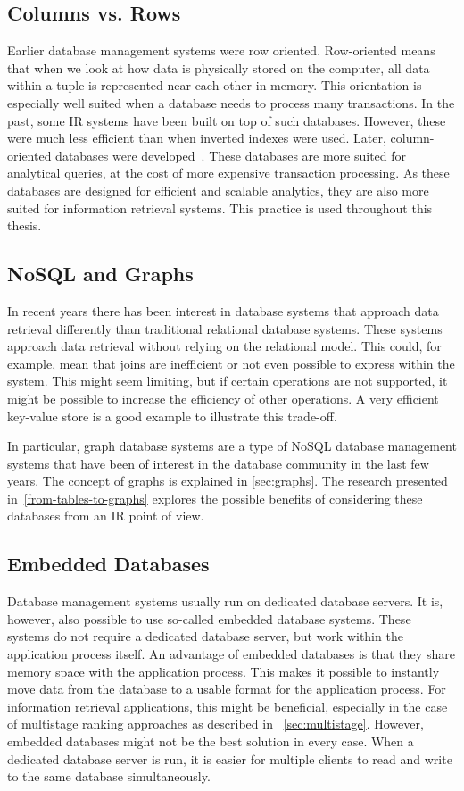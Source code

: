 \subsection{Columns vs. Rows}
Earlier database management systems were row oriented. Row-oriented means that when we look at how data is physically stored on the computer, all data within a tuple is represented near each other in memory. This orientation is especially well suited when a database needs to process many transactions. In the past, some IR systems have been built on top of such databases. However, these were much less efficient than when inverted indexes were used. Later, column-oriented databases were developed~\cite{column-oriented,monet}. These databases are more suited for analytical queries, at the cost of more expensive transaction processing. As these databases are designed for efficient and scalable analytics, they are also more suited for information retrieval systems. This practice is used throughout this thesis. 

\subsection{NoSQL and Graphs}
\label{sec:nosqlgraph}
In recent years there has been interest in database systems that approach data retrieval differently than traditional relational database systems. These systems approach data retrieval without relying on the relational model. This could, for example, mean that joins are inefficient or not even possible to express within the system. This might seem limiting, but if certain operations are not supported, it might be possible to increase the efficiency of other operations. A very efficient key-value store is a good example to illustrate this trade-off.

In particular, graph database systems are a type of NoSQL database management systems that have been of interest in the database community in the last few years. The concept of graphs is explained in \cref{sec:graphs}. The research presented in~\cref{from-tables-to-graphs} explores the possible benefits of considering these databases from an IR point of view.

\subsection{Embedded Databases}
Database management systems usually run on dedicated database servers. It is, however, also possible to use so-called embedded database systems. These systems do not require a dedicated database server, but work within the application process itself. An advantage of embedded databases is that they share memory space with the application process. This makes it possible to instantly move data from the database to a usable format for the application process. For information retrieval applications, this might be beneficial, especially in the case of multistage ranking approaches as described in ~\cref{sec:multistage}. However, embedded databases might not be the best solution in every case. When a dedicated database server is run, it is easier for multiple clients to read and write to the same database simultaneously. 

